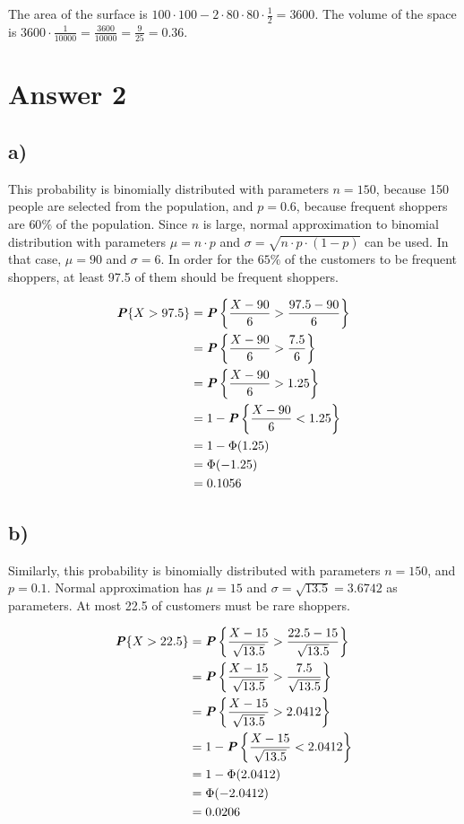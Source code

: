 \documentclass[12pt]{article}
\newcommand{\boldP}{\textbf{\textit{P}}}
\begin{document}
\noindent
The area of the surface is $100 \cdot 100 - 2 \cdot 80 \cdot 80 \cdot
\frac{1}{2} = 3600$. The volume of the space is $3600 \cdot \frac{1}{10000} =
\frac{3600}{10000} = \frac{9}{25} = 0.36$.

\newpage

\section*{Answer 2}

\subsection*{a)}

This probability is binomially distributed with parameters $n = 150$, because
150 people are selected from the population, and $p = 0.6$, because frequent
shoppers are $60\%$ of the population. Since $n$ is large, normal approximation
to binomial distribution with parameters $\mu = n \cdot p$ and $\sigma = \sqrt{n
\cdot p \cdot (1 - p)}$ can be used. In that case, $\mu = 90$ and $\sigma = 6$.
In order for the $65\%$ of the customers to be frequent shoppers, at least 97.5
of them should be frequent shoppers.

\begin{align*}
  \boldP\{X > 97.5\}
    &= \boldP \left\{ \frac{X - 90}{6} > \frac{97.5 - 90}{6} \right\} \\
    &= \boldP \left\{ \frac{X - 90}{6} > \frac{7.5}{6} \right\} \\
    &= \boldP \left\{ \frac{X - 90}{6} > 1.25 \right\} \\
    &= 1 - \boldP \left\{ \frac{X - 90}{6} < 1.25 \right\} \\
    &= 1 - \Phi(1.25) \\
    &= \Phi(-1.25) \\
    &= 0.1056
\end{align*}

\subsection*{b)}

Similarly, this probability is binomially distributed with parameters $n = 150$,
and $p = 0.1$. Normal approximation has $\mu = 15$ and $\sigma = \sqrt{13.5} =
3.6742$ as parameters. At most 22.5 of customers must be rare shoppers.

\begin{align*}
  \boldP\{X > 22.5\}
    &= \boldP \left\{ \frac{X - 15}{\sqrt{13.5}}
                    > \frac{22.5 - 15}{\sqrt{13.5}} \right\} \\
    &= \boldP \left\{ \frac{X - 15}{\sqrt{13.5}}
                    > \frac{7.5}{\sqrt{13.5}} \right\} \\
    &= \boldP \left\{ \frac{X - 15}{\sqrt{13.5}} > 2.0412 \right\} \\
    &= 1 - \boldP \left\{ \frac{X - 15}{\sqrt{13.5}} < 2.0412 \right\} \\
    &= 1 - \Phi(2.0412) \\
    &= \Phi(-2.0412) \\
    &= 0.0206
\end{align*}
\end{document}
